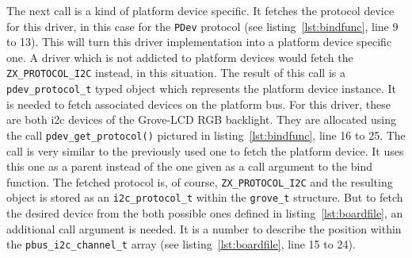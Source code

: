 The next call is a kind of platform device specific.
It fetches the protocol device for this driver, in this case for the \texttt{PDev} protocol (see listing~\ref{lst:bindfunc}, line 9 to 13).
This will turn this driver implementation into a platform device specific one.
A driver which is not addicted to platform devices would fetch the \texttt{ZX_PROTOCOL_I2C} instead, in this situation.
The result of this call is a \texttt{pdev_protocol_t} typed object which represents the platform device instance.
It is needed to fetch associated devices on the platform bus.
For this driver, these are both \ac{i2c} devices of the Grove-LCD RGB backlight.
They are allocated using the call \texttt{pdev_get_protocol()} pictured in listing~\ref{lst:bindfunc}, line 16 to 25.
The call is very similar to the previously used one to fetch the platform device.
It uses this one as a parent instead of the one given as a call argument to the bind function.
The fetched protocol is, of course, \texttt{ZX_PROTOCOL_I2C} and the resulting object is stored as an \texttt{i2c_protocol_t} within the \texttt{grove_t} structure.
But to fetch the desired device from the both possible ones defined in listing~\ref{lst:boardfile}, an additional call argument is needed.
It is a number to describe the position within the \texttt{pbus_i2c_channel_t} array (see listing~\ref{lst:boardfile}, line 15 to 24).
%
